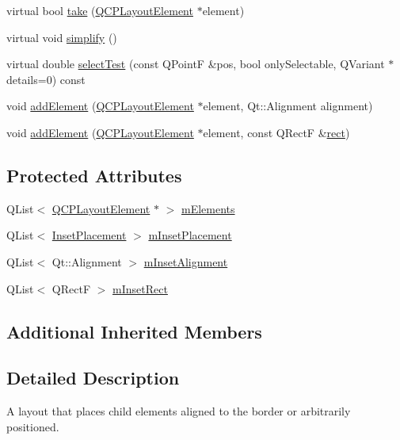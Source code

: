 \begin{DoxyCompactItemize}
\item 
virtual bool \hyperlink{class_q_c_p_layout_inset_a9ac707ccff650633b97f52dd5cddcf49}{take} (\hyperlink{class_q_c_p_layout_element}{Q\+C\+P\+Layout\+Element} $\ast$element)
\item 
virtual void \hyperlink{class_q_c_p_layout_inset_abb9eb23bf2d7c587a8abe02d065eae0a}{simplify} ()
\item 
virtual double \hyperlink{class_q_c_p_layout_inset_ab5a2f2b88c05e369fd7da9583d17aa3a}{select\+Test} (const Q\+Point\+F \&pos, bool only\+Selectable, Q\+Variant $\ast$details=0) const 
\item 
void \hyperlink{class_q_c_p_layout_inset_ad61529eb576af7f04dff94abb10c745a}{add\+Element} (\hyperlink{class_q_c_p_layout_element}{Q\+C\+P\+Layout\+Element} $\ast$element, Qt\+::\+Alignment alignment)
\item 
void \hyperlink{class_q_c_p_layout_inset_a8ff61fbee4a1f0ff45c398009d9f1e56}{add\+Element} (\hyperlink{class_q_c_p_layout_element}{Q\+C\+P\+Layout\+Element} $\ast$element, const Q\+Rect\+F \&\hyperlink{class_q_c_p_layout_element_affdfea003469aac3d0fac5f4e06171bc}{rect})
\end{DoxyCompactItemize}
\subsection*{Protected Attributes}
\begin{DoxyCompactItemize}
\item 
Q\+List$<$ \hyperlink{class_q_c_p_layout_element}{Q\+C\+P\+Layout\+Element} $\ast$ $>$ \hyperlink{class_q_c_p_layout_inset_a7e618ac870f69f2fe2eae2a04500e763}{m\+Elements}
\item 
Q\+List$<$ \hyperlink{class_q_c_p_layout_inset_a8b9e17d9a2768293d2a7d72f5e298192}{Inset\+Placement} $>$ \hyperlink{class_q_c_p_layout_inset_a57a0a4e445cc78eada29765ecf092abe}{m\+Inset\+Placement}
\item 
Q\+List$<$ Qt\+::\+Alignment $>$ \hyperlink{class_q_c_p_layout_inset_a55e9b84c310136ff985a6544184ab64a}{m\+Inset\+Alignment}
\item 
Q\+List$<$ Q\+Rect\+F $>$ \hyperlink{class_q_c_p_layout_inset_aaa8f6b5029458f3d97a65239524a2b33}{m\+Inset\+Rect}
\end{DoxyCompactItemize}
\subsection*{Additional Inherited Members}


\subsection{Detailed Description}
A layout that places child elements aligned to the border or arbitrarily positioned. 

